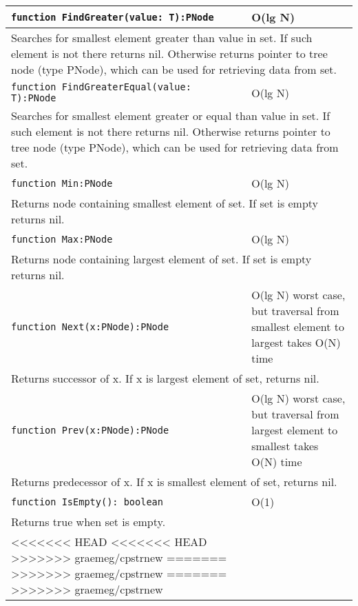 \begin{longtable}{|m{10cm}|m{5cm}|}
\verb!function FindGreater(value: T):PNode! & O(lg N) \\\hline
\multicolumn{2}{|m{15cm}|}{Searches for smallest element greater than value in set. If such element is not there returns nil. Otherwise
returns pointer to tree node (type PNode), which can be used for retrieving data from set.} \\\hline\hline

\verb!function FindGreaterEqual(value: T):PNode! & O(lg N) \\\hline
\multicolumn{2}{|m{15cm}|}{Searches for smallest element greater or equal than value in set. If such element is not there returns nil. Otherwise
returns pointer to tree node (type PNode), which can be used for retrieving data from set.} \\\hline\hline

\verb!function Min:PNode! & O(lg N) \\\hline
\multicolumn{2}{|m{15cm}|}{Returns node containing smallest element of set. If set is empty returns
nil.} \\\hline\hline

\verb!function Max:PNode! & O(lg N) \\\hline
\multicolumn{2}{|m{15cm}|}{Returns node containing largest element of set. If set is empty returns
nil.} \\\hline\hline

\verb!function Next(x:PNode):PNode! & O(lg N) worst case, but traversal from smallest element to
largest takes O(N) time \\\hline
\multicolumn{2}{|m{15cm}|}{Returns successor of x. If x is largest element of set, returns nil.} \\\hline\hline

\verb!function Prev(x:PNode):PNode! & O(lg N) worst case, but traversal from largest element to
smallest takes O(N) time \\\hline
\multicolumn{2}{|m{15cm}|}{Returns predecessor of x. If x is smallest element of set, returns nil.} \\\hline\hline

\verb!function IsEmpty(): boolean! & O(1) \\ \hline
\multicolumn{2}{|m{15cm}|}{Returns true when set is empty.} \\\hline
<<<<<<< HEAD
<<<<<<< HEAD
>>>>>>> graemeg/cpstrnew
=======
>>>>>>> graemeg/cpstrnew
=======
>>>>>>> graemeg/cpstrnew

\end{longtable}
